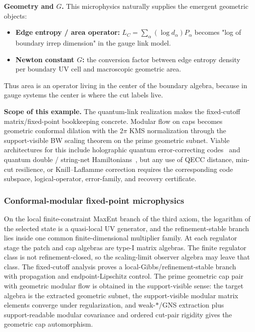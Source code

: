 \textbf{Geometry and \(G\).} This microphysics naturally supplies the emergent geometric objects:

\begin{itemize}
\tightlist
\item
  \textbf{Edge entropy / area operator:} \(L_C = \sum_\alpha (\log d_\alpha) P_\alpha\) becomes "log of boundary irrep dimension" in the gauge link model.
\item
  \textbf{Newton constant \(G\):} the conversion factor between edge entropy density per boundary UV cell and macroscopic geometric area.
\end{itemize}

Thus area is an operator living in the center of the boundary algebra, because in gauge systems the center is where the cut labels live.

\textbf{Scope of this example.} The quantum-link realization makes the fixed-cutoff matrix/fixed-point bookkeeping concrete. Modular flow on caps becomes geometric conformal dilation with the \(2\pi\) KMS normalization through the support-visible BW scaling theorem on the prime geometric subnet. Viable architectures for this include holographic quantum error-correcting codes~\cite{pastawski15} and quantum double / string-net Hamiltonians~\cite{levinWen05}, but any use of QECC distance, min-cut resilience, or Knill--Laflamme correction requires the corresponding code subspace, logical-operator, error-family, and recovery certificate.

\subsubsection{Conformal-modular fixed-point microphysics}\label{27-conformal-modular-fixed-point-microphysics-cmfp}

On the local finite-constraint MaxEnt branch of the third axiom, the logarithm of the selected state is a quasi-local UV generator, and the refinement-stable branch lies inside one common finite-dimensional multiplier family. At each regulator stage the patch and cap algebras are type-I matrix algebras. The finite regulator class is not refinement-closed, so the scaling-limit observer algebra may leave that class. The fixed-cutoff analysis proves a local-Gibbs/refinement-stable branch with propagation and endpoint-Lipschitz control. The prime geometric cap pair with geometric modular flow is obtained in the support-visible sense: the target algebra is the extracted geometric subnet, the support-visible modular matrix elements converge under regularization, and weak-\(*\)/GNS extraction plus support-readable modular covariance and ordered cut-pair rigidity gives the geometric cap automorphism.

